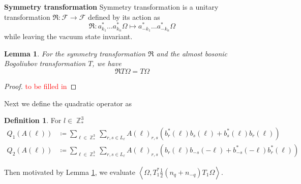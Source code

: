\documentclass[sn-mathphys,Numbered, a4paper ,nocrop]{sn-jnl}%
\DeclareMathOperator{\Z}{\mathbb{Z}}
\newcommand{\half}{\frac{1}{2}}
\newcommand{\eva}[1]{\left\langle #1 \right\rangle}
\theoremstyle{plain}
\newtheorem{lemma}[theorem]{Lemma}
\theoremstyle{definition}
\newtheorem{definition}[theorem]{Definition}
\theoremstyle{remark}
\theoremstyle{plain}
\theoremstyle{definition}
\theoremstyle{remark}
\begin{document}
\textbf{Symmetry transformation} Symmetry transformation is a unitary transformation $\mathfrak{R}:\mathcal{F}\rightarrow \mathcal{F}$ defined by its action as
\begin{equation}
    \mathfrak{R}: a^*_{k_1}\ldots a^*_{k_n}\Omega \mapsto a^*_{-k_1}\ldots a^*_{-k_n}\Omega 
\end{equation}
while leaving the vacuum state invariant.

\begin{lemma}\label{lem:symtransformation}
    For the symmetry transformation $\mathfrak{R}$ and the almost bosonic Bogoliubov transformation $T$, we have
    \begin{equation}
        \mathfrak{R}T\Omega = T\Omega
    \end{equation}
\end{lemma}
\begin{proof}\textcolor{red}{to be filled in}
\end{proof}
Next we define the quadratic operator as 
\begin{definition}
For $l \in \Z^3_*$
\begin{align} 
    Q_1(A(\ell))&\coloneq  \sum\limits_{\ell \in \Z^3_*}\sum\limits_{r,s \in L_{\ell}}A(\ell)_{r,s} \left(b^*_r(\ell)b_{s}(\ell)+b^*_{s}(\ell)b_{r}(\ell)\right)\label{eq:Q1}\\ 
    Q_2(A(\ell))&\coloneq  \sum\limits_{\ell \in \Z^3_*}\sum\limits_{r,s \in L_{\ell}}A(\ell)_{r,s} \left(b_r(\ell)b_{-s}(-\ell)+b^*_{-s}(-\ell)b^*_{r}(\ell)\right)\label{eq:Q2}
\end{align}
    
\end{definition}

Then motivated by Lemma \ref{lem:symtransformation}, we evaluate $\eva{\Omega, T_1^*\half\left(n_q+n_{-q}\right)T_1\Omega}$.\newline 
\end{document}
